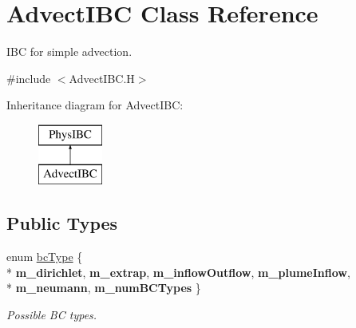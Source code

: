 \hypertarget{class_advect_i_b_c}{\section{Advect\-I\-B\-C Class Reference}
\label{class_advect_i_b_c}
}


I\-B\-C for simple advection.  




{\ttfamily \#include $<$Advect\-I\-B\-C.\-H$>$}

Inheritance diagram for Advect\-I\-B\-C\-:\begin{figure}[H]
\begin{center}
\leavevmode
\includegraphics[height=2.000000cm]{class_advect_i_b_c}
\end{center}
\end{figure}
\subsection*{Public Types}
\begin{DoxyCompactItemize}
\item 
enum \hyperlink{class_advect_i_b_c_ad4d8474d7904dab87483522ebe711b8e}{bc\-Type} \{ \\*
{\bfseries m\-\_\-dirichlet}, 
{\bfseries m\-\_\-extrap}, 
{\bfseries m\-\_\-inflow\-Outflow}, 
{\bfseries m\-\_\-plume\-Inflow}, 
\\*
{\bfseries m\-\_\-neumann}, 
{\bfseries m\-\_\-num\-B\-C\-Types}
 \}
\begin{DoxyCompactList}\small\item\em Possible B\-C types. \end{DoxyCompactList}\end{DoxyCompactItemize}

